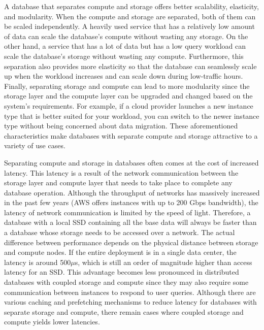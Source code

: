 \medskip
A database that separates compute and storage offers better scalability,
elasticity, and modularity. When the compute and storage are
separated, both of them can be scaled independently. A heavily used service
that has a relatively low amount of data can scale the database's compute without
wasting any storage. On the other hand, a service that has a lot of data but
has a low query workload can scale the database's storage without wasting any
compute. Furthermore, this separation also provides more elasticity so that the
database can seamlessly scale up when the workload increases and can scale down
during low-traffic hours. Finally, separating storage and compute can lead to
more modularity since the storage layer and the compute layer can be upgraded
and changed based on the system's requirements. For example, if a cloud provider
launches a new instance type that is better suited for your workload, you can
switch to the newer instance type without being concerned about data migration.
These aforementioned characteristics make databases with separate compute and
storage attractive to a variety of use cases.

\medskip
Separating compute and storage in databases often comes at the cost of increased
latency. This latency is a result of the network communication between the
storage layer and compute layer that needs to take place to complete any
database operation. Although the throughput of networks has massively increased
in the past few years (AWS offers instances with up to 200 Gbps bandwidth), the
latency of network communication is limited by the speed of light. Therefore, a
database with a local SSD containing all the base data will always be faster
than a database whose storage needs to be accessed over a network. The actual
difference between performance depends on the physical distance between storage
and compute nodes. If the entire deployment is in a single data center, the
latency is around 500$\mu$s, which is still an order of magnitude higher than access latency
for an SSD\cite{jiang2021fusionraid}. This advantage becomes less pronounced in
distributed databases with coupled storage and compute since they may also require
some communication between instances to respond to user queries.
Although there are various caching and prefetching mechanisms to reduce latency
for databases with separate storage and compute, there remain cases where
coupled storage and compute yields lower latencies.


